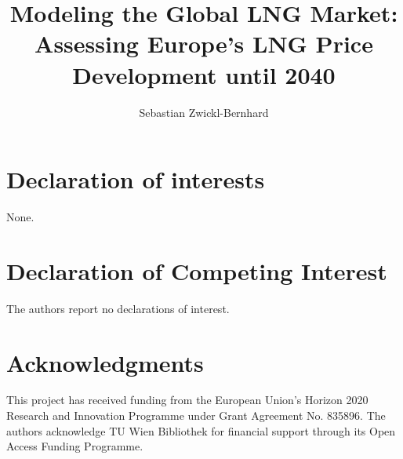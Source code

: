 \documentclass[review]{elsarticle}
\begin{document}
\begin{frontmatter}

\title{Modeling the Global LNG Market:\\Assessing Europe's LNG Price Development until 2040}
\author[1,2]{Sebastian Zwickl-Bernhard}
\address[1]{Energy Economics Group (EEG), Technische Universität Wien, Gusshausstrasse 25-29/E370-3, 1040 Wien, Austria}
\address[2]{Department of Industrial Economics and Technology Management, \protect\\ The Norwegian University of Science and Technology, Trondheim, Norway}


\begin{abstract}
\end{abstract}

\begin{keyword}	
\end{keyword}
\end{frontmatter}


%
%
%
%

\section*{Declaration of interests}
None.
\section*{Declaration of Competing Interest}
The authors report no declarations of interest.
\section*{Acknowledgments}
This project has received funding from the European Union's Horizon 2020 Research and Innovation Programme under Grant Agreement No. 835896. The authors acknowledge TU Wien Bibliothek for financial support through its Open Access Funding Programme.

\appendix
\setcounter{table}{0}
\setcounter{figure}{0}
\end{document}
